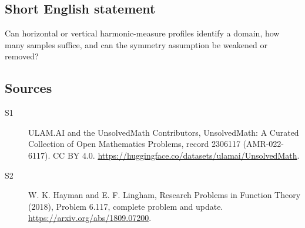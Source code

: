 \documentclass[11pt]{article}
\begin{document}
\subsection{Short English statement}
Can horizontal or vertical harmonic-measure profiles identify a domain, how many samples suffice, and can the symmetry assumption be weakened or removed?
\subsection{Sources}
\begin{description}
\item[\hypertarget{source:2306117:1}{S1}] ULAM.AI and the UnsolvedMath Contributors, UnsolvedMath: A Curated Collection of Open Mathematics Problems, record 2306117 (AMR-022-6117). CC BY 4.0. \url{https://huggingface.co/datasets/ulamai/UnsolvedMath}.
\item[\hypertarget{source:2306117:2}{S2}] W. K. Hayman and E. F. Lingham, Research Problems in Function Theory (2018), Problem 6.117, complete problem and update. \url{https://arxiv.org/abs/1809.07200}.
\end{description}
\label{end:2306117}
\end{document}
